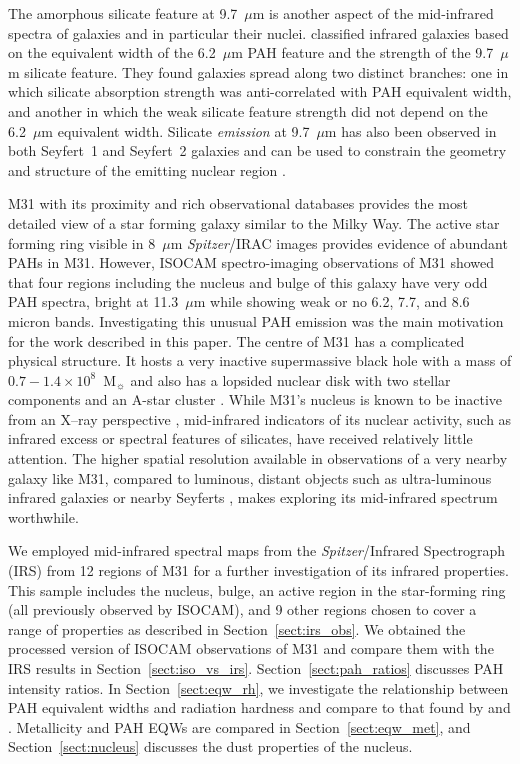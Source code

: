 The amorphous silicate feature at 9.7~$\mu$m is another aspect of the mid-infrared spectra of galaxies and in particular their nuclei.  \citet{Spoon2007} 
classified infrared galaxies based on the equivalent width of the 6.2~$\mu$m PAH feature and the strength of the 9.7~$\mu$m silicate feature. 
They  found galaxies spread along two distinct branches: one in which silicate absorption strength was anti-correlated with PAH
equivalent width, and another in which the weak silicate feature strength did not depend on the 6.2~$\mu$m equivalent width.
Silicate {\em emission} at 9.7~$\mu$m has also been observed in both Seyfert~1 and Seyfert~2 galaxies 
and can be used to constrain the geometry and structure of the emitting nuclear region \citep{Mason2009}.



M31 with its proximity \citep[$785\pm25$ kpc; ][]{Mcc2005} and rich observational databases provides the most detailed view of a star forming galaxy similar 
to the Milky Way. The active star forming ring visible in 8~$\mu$m  {\em Spitzer}/IRAC images \citep{Barmby2006lr} provides evidence of abundant PAHs in M31. 
However, ISOCAM spectro-imaging observations of M31\citep{1998Cesarsky} showed that four regions including the nucleus and bulge 
of this galaxy have very odd PAH spectra, bright at 11.3~$\mu$m while showing weak or no  6.2, 7.7, and 8.6 micron bands. 
Investigating this unusual PAH emission was the main motivation for the work described in this paper. 
The centre of M31 has a complicated physical structure. It hosts a very inactive supermassive black hole with a mass of 
$0.7-1.4 \times 10^8$~M$_{\sun}$ \citep{Bacon2001, Bender2005} and also has a lopsided nuclear disk  with two stellar 
components \citep{Lauer1993} and an A-star cluster \citep{Bender2005}. While M31's nucleus is known to be inactive from an 
X--ray perspective \citep{Li2011}, mid-infrared indicators of its nuclear activity, such
as infrared excess or spectral features of silicates,  have received relatively little attention. 
The higher spatial resolution available in observations of  a very nearby galaxy like M31, compared to 
luminous, distant objects such as ultra-luminous infrared galaxies \citep{Spoon2007} or nearby Seyferts \citep{Mason2009},
makes exploring its mid-infrared spectrum worthwhile.


We employed mid-infrared spectral maps from the {\em Spitzer}/Infrared Spectrograph (IRS) from 12 regions of M31 for a further investigation of 
its infrared properties. This sample includes the nucleus, bulge, an active region in the star-forming ring (all previously observed by ISOCAM), and 9 
other regions chosen to cover a range of properties as described in Section~\ref{sect:irs_obs}. 
We obtained the processed version of ISOCAM observations of M31 and compare them with the IRS results in Section~\ref{sect:iso_vs_irs}. 
Section~\ref{sect:pah_ratios} discusses PAH intensity ratios.
In Section~\ref{sect:eqw_rh}, we investigate the relationship between PAH equivalent widths and radiation 
hardness and compare to that found by \citet{Engelbracht_2008} and \citet{Gordon:2008lr}. Metallicity and PAH EQWs are compared in 
Section~\ref{sect:eqw_met}, and Section~\ref{sect:nucleus} discusses the dust properties of the nucleus. 	
